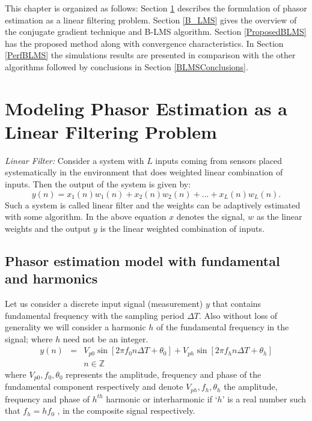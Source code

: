 \documentclass{UCF_ETD}
\begin{document}
This chapter is organized as follows: Section \ref{Modelling}  describes  the formulation of phasor estimation as a linear filtering problem. Section \ref{B_LMS} gives the overview of the conjugate gradient technique and B-LMS algorithm. Section \ref{ProposedBLMS} has the proposed method along with convergence characteristics. In Section \ref{PerfBLMS} the simulations results are presented in comparison with the other algorithms followed by conclusions in Section \ref{BLMSConclusions}.

\section{Modeling Phasor Estimation as a Linear Filtering Problem}\label{Modelling}
\emph{Linear Filter:} Consider a system with $L$ inputs coming from sensors placed systematically in the environment that does weighted linear combination of inputs. Then the output of the system is given by:
\begin{equation}\label{LinearFilter}
y(n) = x_1(n)w_1(n)+x_2(n)w_2(n)+...+x_L(n)w_L(n).
\end{equation}
Such a system is called linear filter and the weights can be adaptively estimated with some algorithm. In the above equation $x$ denotes the signal, $w$ as the linear weights and the output $y$ is the linear weighted combination of inputs. 
\subsection{Phasor estimation model with fundamental and harmonics} \label{PhasorSubSection}
Let us consider a discrete input signal (measurement) $y$ that contains fundamental frequency with the sampling period
$\Delta T$. Also without loss of generality we will consider a harmonic $h$ of the fundamental frequency in the signal; where $h$ need not be an integer.
\begin{eqnarray} \label{MainSinusoidalModel}
y(n)&{}={}&V_{p0} \sin[2\pi f_0 n\Delta T+ \theta_0]+V_{ph} \sin[2\pi f_h n\Delta T+ \theta_h]    \nonumber\\
&&n \in \mathbb{Z}
\end{eqnarray}
where \begin{math} V_{p0},f_0,\theta_0 \end{math} represents the amplitude, frequency and phase of the fundamental component respectively and denote \begin{math} V_{ph}, f_h,\theta_h \end{math} the amplitude, frequency and phase of $h^{th}$ harmonic or interharmonic if ‘$h$’ is a real number such that $ f_h = hf_0 $ , in the composite signal respectively.
\end{document}
